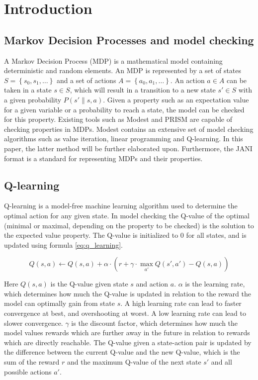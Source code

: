 \section{Introduction}

\subsection{Markov Decision Processes and model checking}

A Markov Decision Process (MDP) is a mathematical model containing deterministic and random elements. An MDP is represented by a set of states $S = \left\{ s_0, s_1, \dots \right\}$ and a set of actions $A = \left\{ a_0, a_1, \dots \right\}$. An action $a \in A$ can be taken in a state $s \in S$, which will result in a transition to a new state $s' \in S$ with a given probability $P(s' \| s, a)$. Given a property such as an expectation value for a given variable or a probability to reach a state, the model can be checked for this property. Existing tools such as Modest \cite{modest} and PRISM \cite{prism} are capable of checking properties in MDPs. Modest contains an extensive set of model checking algorithms such as value iteration, linear programming and Q-learning. In this paper, the latter method will be further elaborated upon. Furthermore, the JANI \cite{jani} format is a standard for representing MDPs and their properties.

\subsection{Q-learning}

Q-learning is a model-free machine learning algorithm used to determine the optimal action for any given state. In model checking the Q-value of the optimal (minimal or maximal, depending on the property to be checked) is the solution to the expected value property. The Q-value is initialized to $0$ for all states, and is updated using formula \ref{eq:q_learning}.

\begin{equation}\label{eq:q_learning}
    Q(s, a) \leftarrow Q(s, a) + \alpha \cdot (r + \gamma \cdot \max_{a'} Q(s', a') - Q(s, a))
\end{equation}

Here $Q(s, a)$ is the Q-value given state $s$ and action $a$. $\alpha$ is the learning rate, which determines how much the Q-value is updated in relation to the reward the model can optimally gain from state $s$. A high learning rate can lead to faster convergence at best, and overshooting at worst. A low learning rate can lead to slower convergence. $\gamma$ is the discount factor, which determines how much the model values rewards which are further away in the future in relation to rewards which are directly reachable. The Q-value given a state-action pair is updated by the difference between the current Q-value and the new Q-value, which is the sum of the reward $r$ and the maximum Q-value of the next state $s'$ and all possible actions $a'$.

